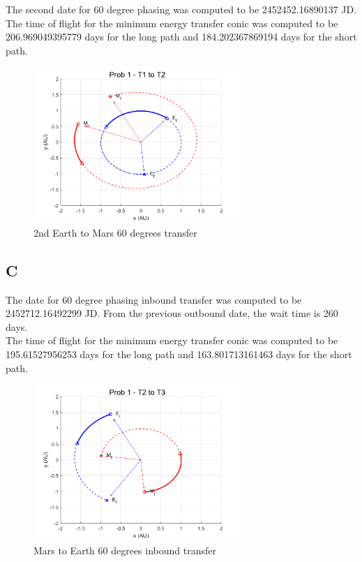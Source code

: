 \documentclass[conf]{new-aiaa}
\begin{document}
The second date for 60 degree phasing was computed to be 2452452.16890137 JD. \\ 

The time of flight for the minimum energy transfer conic was computed to be 206.969049395779 days for the long path and 184.202367869194 days for the short path. \\ 

\begin{figure}[H]
    \centering 
    \includegraphics[width=0.7\textwidth]{Prob 1 - T1 to T2.pdf}
    \caption{2nd Earth to Mars 60 degrees transfer}
\end{figure}

\subsection*{C}

The date for 60 degree phasing inbound transfer was computed to be 
2452712.16492299 JD. From the previous outbound date, the wait time is 260 days. \\ 

The time of flight for the minimum energy transfer conic was computed to be 195.61527956253 days for the long path and 163.801713161463 days for the short path. \\ 

\begin{figure}[H]
    \centering 
    \includegraphics[width=0.7\textwidth]{Prob 1 - T2 to T3.pdf}
    \caption{Mars to Earth 60 degrees inbound transfer}
\end{figure}
\end{document}
